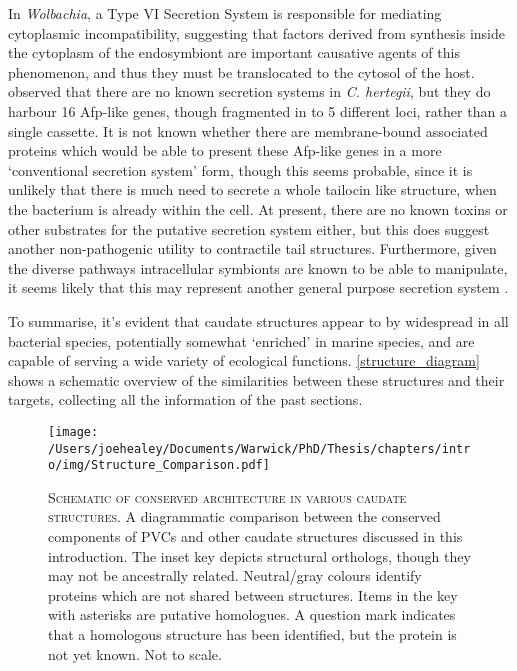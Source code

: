 In \emph{Wolbachia}, a Type VI Secretion System is responsible for mediating cytoplasmic incompatibility, suggesting that factors derived from synthesis inside the cytoplasm of the endosymbiont are important causative agents of this phenomenon, and thus they must be translocated to the cytosol of the host. \cite{Penz2012} observed that there are no known secretion systems in \emph{C. hertegii}, but they do harbour 16 Afp-like genes, though fragmented in to 5 different loci, rather than a single cassette. It is not known whether there are membrane-bound associated proteins which would be able to present these Afp-like genes in a more `conventional secretion system' form, though this seems probable, since it is unlikely that there is much need to secrete a whole tailocin like structure, when the bacterium is already within the cell. At present, there are no known toxins or other substrates for the putative secretion system either, but this does suggest another non-pathogenic utility to contractile tail structures. Furthermore, given the diverse pathways intracellular symbionts are known to be able to manipulate, it seems likely that this may represent another general purpose secretion system \citep{Werren2008}.


To summarise, it's evident that caudate structures appear to by widespread in all bacterial species, potentially somewhat `enriched' in marine species, and are capable of serving a wide variety of ecological functions. \vref{structure_diagram} shows a schematic overview of the similarities between these structures and their targets, collecting all the information of the past sections.

\begin{landscape}
\begin{figure}[p]
\texttt{[image: /Users/joehealey/Documents/Warwick/PhD/Thesis/chapters/intro/img/Structure\_Comparison.pdf]}
	\captionsetup{singlelinecheck=off, justification=justified, font=footnotesize, aboveskip=5pt}
	\caption[Schematic of conserved caudate architecture]{\textsc{\normalsize Schematic of conserved architecture in various caudate structures.}\vspace{0.1cm} \newline A diagrammatic comparison between the conserved components of PVCs and other caudate structures discussed in this introduction. The inset key depicts structural orthologs, though they may not be ancestrally related. Neutral/gray colours identify proteins which are not shared between structures. Items in the key with asterisks are putative homologues. A question mark indicates that a homologous structure has been identified, but the protein is not yet known. Not to scale.}
	\label{structure_diagram}
\end{figure}
\end{landscape}
\newpage


